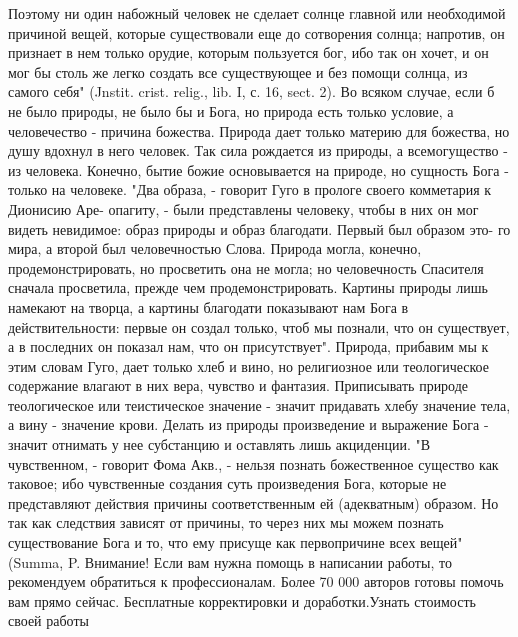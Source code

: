 \documentclass[12pt,oneside]{book}
\begin{document}
Поэтому ни один набожный человек не сделает солнце главной или необходимой причиной вещей, которые существовали еще до сотворения солнца; напротив, он признает в нем только орудие, которым пользуется бог, ибо так он хочет, и он мог бы столь же легко создать все существующее и без помощи солнца, из самого себя" (Jnstit. crist. relig., lib. I, с. 16, sect. 2). Во всяком случае, если б не было природы, не было бы и Бога, но природа есть только условие, а человечество - причина божества. Природа дает только материю для божества, но душу вдохнул в него человек. Так сила рождается из природы, а всемогущество - из человека. Конечно, бытие божие основывается на природе, но сущность Бога - только на человеке. "Два образа, - говорит Гуго в прологе своего комметария к Дионисию Аре- опагиту, - были представлены человеку, чтобы в них он мог видеть невидимое: образ природы и образ благодати. Первый был образом это- го мира, а второй был человечностью Слова. Природа могла, конечно, продемонстрировать, но просветить она не могла; но человечность Спасителя сначала просветила, прежде чем продемонстрировать. Картины природы лишь намекают на творца, а картины благодати показывают нам Бога в действительности: первые он создал только, чтоб мы познали, что он существует, а в последних он показал нам, что он присутствует". Природа, прибавим мы к этим словам Гуго, дает только хлеб и вино, но религиозное или теологическое содержание влагают в них вера, чувство и фантазия. Приписывать природе теологическое или теистическое значение - значит придавать хлебу значение тела, а вину - значение крови. Делать из природы произведение и выражение Бога - значит отнимать у нее субстанцию и оставлять лишь акциденции. "В чувственном, - говорит Фома Акв., - нельзя познать божественное существо как таковое; ибо чувственные создания суть произведения Бога, которые не представляют действия причины соответственным ей (адекватным) образом. Но так как следствия зависят от причины, то через них мы можем познать существование Бога и то, что ему присуще как первопричине всех вещей" (Summa, P.
Внимание!
Если вам нужна помощь в написании работы, то рекомендуем обратиться к профессионалам. Более 70 000 авторов готовы помочь вам прямо сейчас. Бесплатные корректировки и доработки.Узнать стоимость своей работы
\end{document}
